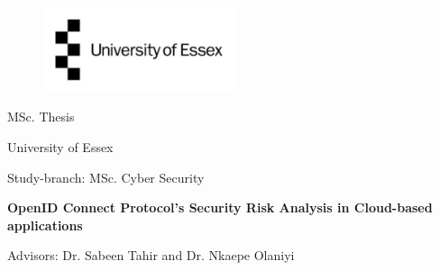 
\label{titlePage}
\begin{figure}[h]
\centering
\includegraphics[width=0.50\textwidth]{pics/logo.pdf}
\end{figure}
\FloatBarrier

\begin{Large} 
\begin{center}
MSc. Thesis
\end{center}
\end{Large} 

\vspace*{5mm}

\begin{large} 
\begin{center}
University of Essex
\end{center}
\end{large} 

\begin{large} 
\begin{center}
Study-branch: MSc. Cyber Security
\end{center}
\end{large}



\begin{Large} 
\begin{center}
\textbf{OpenID Connect Protocol's Security Risk Analysis in Cloud-based applications}
\end{center}
\end{Large}

\vspace*{5mm}

\begin{large} 
\begin{center}
Advisors: Dr. Sabeen Tahir and Dr. Nkaepe Olaniyi
\end{center}
\end{large} 




\pagestyle{empty} %

